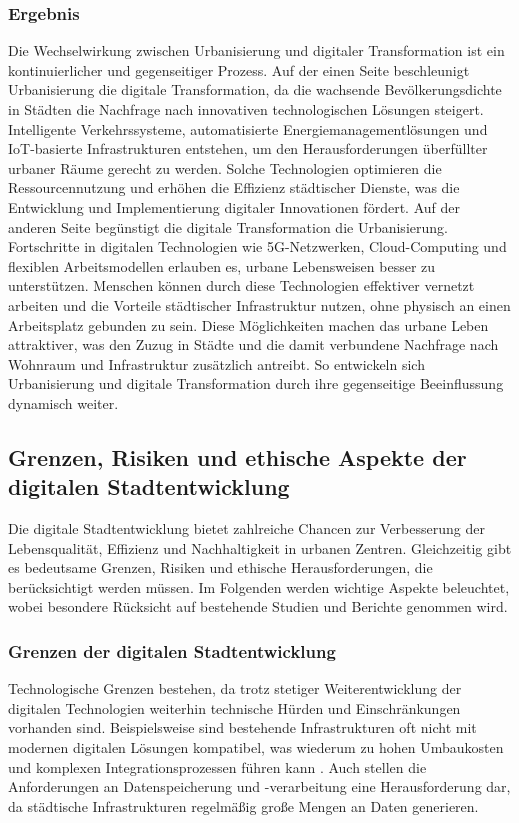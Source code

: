 \documentclass[conference,compsoc,final,a4paper, onecolumn, 11pt]{IEEEtran}
\begin{document}
\subsubsection{Ergebnis}
Die Wechselwirkung zwischen Urbanisierung und digitaler Transformation ist ein kontinuierlicher und gegenseitiger Prozess.
Auf der einen Seite beschleunigt Urbanisierung die digitale Transformation, da die wachsende Bevölkerungsdichte in Städten die Nachfrage nach innovativen technologischen Lösungen steigert. 
Intelligente Verkehrssysteme, automatisierte Energiemanagementlösungen und \ac{IoT}-basierte Infrastrukturen entstehen, um den Herausforderungen überfüllter urbaner Räume gerecht zu werden. 
Solche Technologien optimieren die Ressourcennutzung und erhöhen die Effizienz städtischer Dienste, was die Entwicklung und Implementierung digitaler Innovationen fördert.
Auf der anderen Seite begünstigt die digitale Transformation die Urbanisierung. 
Fortschritte in digitalen Technologien wie 5G-Netzwerken, Cloud-Computing und flexiblen Arbeitsmodellen erlauben es, urbane Lebensweisen besser zu unterstützen. 
Menschen können durch diese Technologien effektiver vernetzt arbeiten und die Vorteile städtischer Infrastruktur nutzen, ohne physisch an einen Arbeitsplatz gebunden zu sein. 
Diese Möglichkeiten machen das urbane Leben attraktiver, was den Zuzug in Städte und die damit verbundene Nachfrage nach Wohnraum und Infrastruktur zusätzlich antreibt.
So entwickeln sich Urbanisierung und digitale Transformation durch ihre gegenseitige Beeinflussung dynamisch weiter. 


\subsection{Grenzen, Risiken und ethische Aspekte der digitalen Stadtentwicklung}
Die digitale Stadtentwicklung bietet zahlreiche Chancen zur Verbesserung der Lebensqualität, Effizienz und Nachhaltigkeit in urbanen Zentren. 
Gleichzeitig gibt es bedeutsame Grenzen, Risiken und ethische Herausforderungen, die berücksichtigt werden müssen. 
Im Folgenden werden wichtige Aspekte beleuchtet, wobei besondere Rücksicht auf bestehende Studien und Berichte genommen wird.

\subsubsection{Grenzen der digitalen Stadtentwicklung}
Technologische Grenzen bestehen, da trotz stetiger Weiterentwicklung der digitalen Technologien weiterhin technische Hürden und Einschränkungen vorhanden sind. 
Beispielsweise sind bestehende Infrastrukturen oft nicht mit modernen digitalen Lösungen kompatibel, was wiederum zu hohen Umbaukosten und komplexen Integrationsprozessen führen kann \autocite{Dodge2020}. 
Auch stellen die Anforderungen an Datenspeicherung und -verarbeitung eine Herausforderung dar, da städtische Infrastrukturen regelmäßig große Mengen an Daten generieren.
\end{document}
